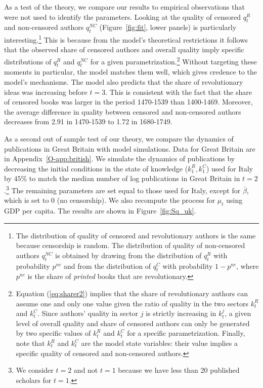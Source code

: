 As a test of the theory, we compare our results to empirical observations that were not used to identify the parameters. Looking at the quality of censored $q_t^R$ and non-censored authors $q_t^{NC}$ (Figure~\ref{fig:fit}, lower panels) is particularly interesting.\footnote{The distribution of quality of censored and revolutionary authors is the same because censorship is random. The distribution of quality of non-censored authors  $q_t^{NC}$ is obtained by drawing from the distribution of $q^R_t$ with probability $p^{nc}$ and from the distribution of $q^C_t$ with probability $1-p^{nc}$, where $p^{nc}$ is the share of \textit{printed} books that are revolutionary.} This is because from the model's theoretical restrictions it follows that the observed share of censored authors and overall quality imply specific distributions of $q_t^R$ and $q_t^{NC}$ for a given parametrization.\footnote{Equation (\ref{eq:sharer2}) implies that the share of revolutionary authors can assume one and only one value given the ratio of quality in the two sectors $k^R_t$ and $k^C_t$. Since authors’ quality  in sector $j$ is strictly increasing in $k^j_t$, a given level of overall quality and share of censored authors can only be generated by two specific values of $k^R_t$ and $k^C_t$ for a specific parametrization. Finally, note that $k^R_t$ and $k^C_t$ are the model state variables: their value implies a specific quality of censored and non-censored authors.} Without targeting these moments in particular, the model matches them well, which gives credence to the model's mechanisms. The model also predicts that the share of revolutionary ideas was increasing before $t=3$. This is consistent with the fact that the share of censored books was larger in the period 1470-1539 than 1400-1469. Moreover, the average difference in quality between censored and non-censored authors decreases from 2.91 in 1470-1539 to 1.72 in 1680-1749.

As a second out of sample test of our theory, we compare the dynamics of publications in Great Britain with model simulations. Data for Great Britain are in Appendix~\ref{O-app:british}. We simulate the dynamics of publications by decreasing the initial conditions in the state of knowledge ($k^R_1,k^C_1$) used for Italy by $45\%$ to match the median number of log publications in Great Britain in $t=2$.\footnote{We consider $t=2$ and not $t=1$ because we have less than 20 published scholars for $t=1$.} The remaining parameters are set equal to those used for Italy, except for $\overline{\beta}$, which is set to 0 (no censorship). We also recompute the process for $\mu_t$ using GDP per capita. The results are shown in Figure~\ref{fig:Sq_uk}.


